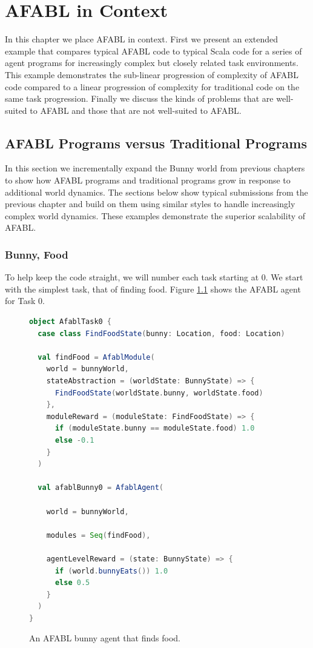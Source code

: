 \chapter{AFABL in Context}\label{ch:afabl-context}

In this chapter we place AFABL in context. First we present an extended example that compares typical AFABL code to typical Scala code for a series of agent programs for increasingly complex but closely related task environments. This example demonstrates the sub-linear progression of complexity of AFABL code compared to a linear progression of complexity for traditional code on the same task progression. Finally we discuss the kinds of problems that are well-suited to AFABL and those that are not well-suited to AFABL.

\section{AFABL Programs versus Traditional Programs}

In this section we incrementally expand the Bunny world from previous chapters to show how AFABL programs and traditional programs grow in response to additional world dynamics. The sections below show typical submissions from the previous chapter and build on them using similar styles to handle increasingly complex world dynamics. These examples demonstrate the superior scalability of AFABL.

\subsection{Bunny, Food}

To help keep the code straight, we will number each task starting at 0. We start with the simplest task, that of finding food. Figure \ref{fig:afabl0} shows the AFABL agent for Task 0.

\begin{figure}[h]
\begin{lstlisting}[language=Scala]
object AfablTask0 {
  case class FindFoodState(bunny: Location, food: Location)

  val findFood = AfablModule(
    world = bunnyWorld,
    stateAbstraction = (worldState: BunnyState) => {
      FindFoodState(worldState.bunny, worldState.food)
    },
    moduleReward = (moduleState: FindFoodState) => {
      if (moduleState.bunny == moduleState.food) 1.0
      else -0.1
    }
  )

  val afablBunny0 = AfablAgent(

    world = bunnyWorld,

    modules = Seq(findFood),

    agentLevelReward = (state: BunnyState) => {
      if (world.bunnyEats()) 1.0
      else 0.5
    }
  )
}
\end{lstlisting}
\caption{An AFABL bunny agent that finds food.}
\label{fig:afabl0}
\end{figure}

